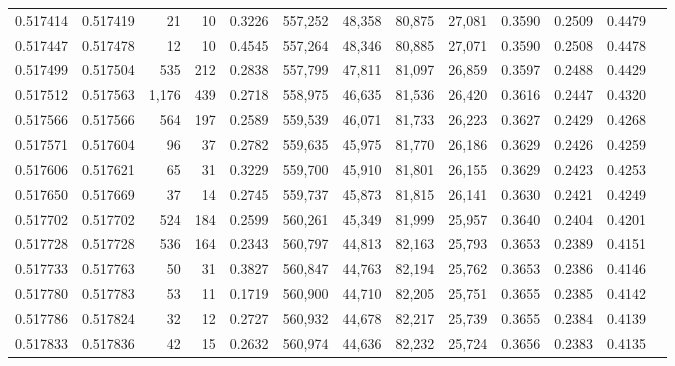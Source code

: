 \begin{tabular}{rrrrrrrrrrrrr}
0.517414 & 0.517419 &    21 &    10 &                                     0.3226 & 557,252 &  48,358 &  80,875 &  27,081 & 0.3590 & 0.2509 & 0.4479 \\
0.517447 & 0.517478 &    12 &    10 &                                     0.4545 & 557,264 &  48,346 &  80,885 &  27,071 & 0.3590 & 0.2508 & 0.4478 \\
0.517499 & 0.517504 &   535 &   212 &                                     0.2838 & 557,799 &  47,811 &  81,097 &  26,859 & 0.3597 & 0.2488 & 0.4429 \\
0.517512 & 0.517563 & 1,176 &   439 &                                     0.2718 & 558,975 &  46,635 &  81,536 &  26,420 & 0.3616 & 0.2447 & 0.4320 \\
0.517566 & 0.517566 &   564 &   197 &                                     0.2589 & 559,539 &  46,071 &  81,733 &  26,223 & 0.3627 & 0.2429 & 0.4268 \\
0.517571 & 0.517604 &    96 &    37 &                                     0.2782 & 559,635 &  45,975 &  81,770 &  26,186 & 0.3629 & 0.2426 & 0.4259 \\
0.517606 & 0.517621 &    65 &    31 &                                     0.3229 & 559,700 &  45,910 &  81,801 &  26,155 & 0.3629 & 0.2423 & 0.4253 \\
0.517650 & 0.517669 &    37 &    14 &                                     0.2745 & 559,737 &  45,873 &  81,815 &  26,141 & 0.3630 & 0.2421 & 0.4249 \\
0.517702 & 0.517702 &   524 &   184 &                                     0.2599 & 560,261 &  45,349 &  81,999 &  25,957 & 0.3640 & 0.2404 & 0.4201 \\
0.517728 & 0.517728 &   536 &   164 &                                     0.2343 & 560,797 &  44,813 &  82,163 &  25,793 & 0.3653 & 0.2389 & 0.4151 \\
0.517733 & 0.517763 &    50 &    31 &                                     0.3827 & 560,847 &  44,763 &  82,194 &  25,762 & 0.3653 & 0.2386 & 0.4146 \\
0.517780 & 0.517783 &    53 &    11 &                                     0.1719 & 560,900 &  44,710 &  82,205 &  25,751 & 0.3655 & 0.2385 & 0.4142 \\
0.517786 & 0.517824 &    32 &    12 &                                     0.2727 & 560,932 &  44,678 &  82,217 &  25,739 & 0.3655 & 0.2384 & 0.4139 \\
0.517833 & 0.517836 &    42 &    15 &                                     0.2632 & 560,974 &  44,636 &  82,232 &  25,724 & 0.3656 & 0.2383 & 0.4135 \\

\end{tabular}
